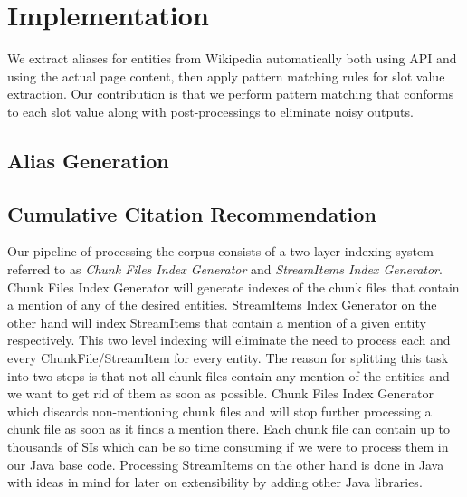 

\section{Implementation}
\label{section:implementation}

We extract aliases for entities from Wikipedia automatically both using API and using the actual page content, then apply pattern matching rules for slot value extraction. Our contribution is that we perform pattern matching that conforms to each slot value along with post-processings to eliminate noisy outputs. 


\subsection{Alias Generation}
\label{section:aliasgeneration}


\subsection{Cumulative Citation Recommendation}
\label{sec:ccrimpl}

Our pipeline of processing the corpus consists of a two layer indexing system referred to as \textit{Chunk Files Index Generator} and \textit{StreamItems Index Generator}. Chunk Files Index Generator will generate indexes of the chunk files that contain a mention of any of the desired entities. StreamItems Index Generator 
on the other hand will index StreamItems that contain a mention of a given entity respectively. This two level indexing will eliminate the need to process each and every ChunkFile/StreamItem for every entity. The reason for splitting this task into two steps is that not all chunk files contain any mention of the entities and 
we want to get rid of them as soon as possible. Chunk Files Index Generator which discards non-mentioning chunk files and will stop further processing a chunk file as soon as it finds a mention there. Each chunk file can contain up to thousands of SIs which can be so time consuming if we were to process them in our Java base code. Processing StreamItems on the other hand is done in Java with ideas in mind for later on extensibility by adding other Java libraries.



